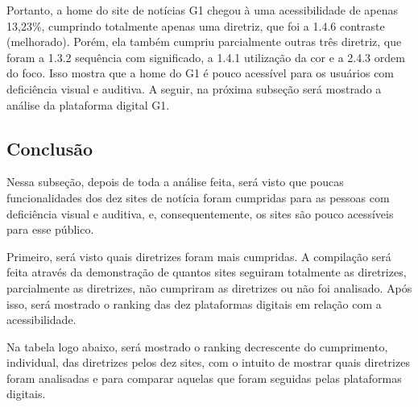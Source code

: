 \documentclass[a4paper]{article}
\begin{document}
\begin{titlepage}
Portanto, a home do site de notícias G1 chegou à uma acessibilidade de apenas 13,23\%, cumprindo totalmente apenas uma diretriz, que foi a 1.4.6 contraste (melhorado). Porém, ela também cumpriu parcialmente outras três diretriz, que foram a 1.3.2 sequência com significado, a 1.4.1 utilização da cor e a 2.4.3 ordem do foco. Isso mostra que a home do G1 é pouco acessível para os usuários com deficiência visual e auditiva. A seguir, na próxima subseção será mostrado a análise da plataforma digital G1.

\subsection{Conclusão}

Nessa subseção, depois de toda a análise feita, será visto que poucas funcionalidades dos dez sites de notícia foram cumpridas para as pessoas com deficiência visual e auditiva, e, consequentemente, os sites são pouco acessíveis para esse público.

Primeiro, será visto quais diretrizes foram mais cumpridas. A compilação será feita através da demonstração de quantos sites seguiram totalmente as diretrizes, parcialmente as diretrizes, não cumpriram as diretrizes ou não foi analisado. Após isso, será mostrado o ranking das dez plataformas digitais em relação com a acessibilidade.

Na tabela logo abaixo, será mostrado o ranking decrescente do cumprimento, individual, das diretrizes pelos dez sites, com o intuito de mostrar quais diretrizes foram analisadas e para comparar aquelas que foram seguidas pelas plataformas digitais.\\


\end{titlepage}
\end{document}
